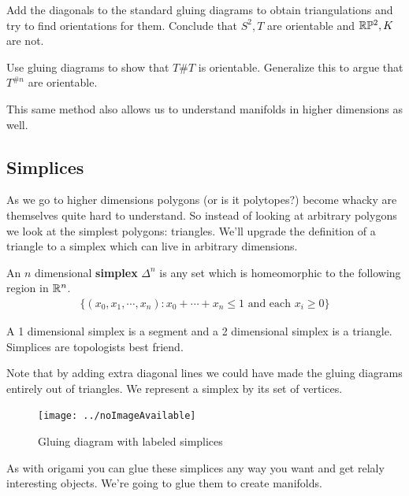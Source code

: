 \begin{exercise}
	Add the diagonals to the standard gluing diagrams to obtain triangulations and try to find orientations for them. Conclude that $S^2,T$ are orientable and $\mathbb{R}\mathbb{P}^2,K$ are not.
\end{exercise}

\begin{exercise}
	Use gluing diagrams to show that $T\#T$ is orientable. Generalize this to argue that $T ^{\# n}$ are orientable.
\end{exercise}

This same method also allows us to understand manifolds in higher dimensions as well.







\subsection{Simplices}
As we go to higher dimensions polygons (or is it polytopes?) become whacky are themselves quite hard to understand. So instead of looking at arbitrary polygons we look at the simplest polygons: triangles. We'll upgrade the definition of a triangle to a simplex which can live in arbitrary dimensions.

\begin{definition}
	An $n$ dimensional \textbf{simplex} $\Delta^n$ is any set which is homeomorphic to the following region in $\mathbb{R}^{n}$.
	\begin{align}
		\{ (x_0, x_1, \cdots, x_n) : x_0 + \cdots + x_n \le 1 \mbox{ and each } x_i \ge 0  \}
	\end{align}
\end{definition}
A 1 dimensional simplex is a segment and a 2 dimensional simplex is a triangle.
Simplices are topologists best friend.

Note that by adding extra diagonal lines we could have made the gluing diagrams entirely out of triangles.
We represent a simplex by its set of vertices.

\begin{figure}[h]
	\centering \texttt{[image: ../noImageAvailable]}
	\caption{Gluing diagram with labeled simplices}
	\label{}
\end{figure}

As with origami you can glue these simplices any way you want and get relaly interesting objects. We're going to glue them to create manifolds.

